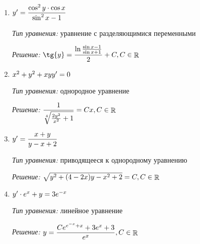 \begin{enumerate}                                                   
	\item 
		$ {y}' = \dfrac{\cos^{2}{y} \cdot \cos{x}}{\sin^2{x} - 1} $
		
		\textit{Тип уравнения:} уравнение с разделяющимися переменными
		
		\textit{Решение:} 
		$ \tg{y} = \dfrac{\ln{\frac{\sin{x} - 1}{\sin{x} + 1}}}{2} + C, C \in \rational $ 

	\item 
		$ {x}^2 + {y}^2 + xyy' = 0 $
		
		\textit{Тип уравнения:} однородное уравнение
		
		\textit{Решение:}
		$ \dfrac{1}{\sqrt[4]{\frac{2y^2}{x^2} + 1}} = Cx, C \in \mathop{\rm \mathbb{R}} $ 
		
	\newpage
		
	\item 
		$ {y}' = \dfrac{x + y}{y - x + 2} $
		
		\textit{Тип уравнения:} приводящееся к однородному уравнению
		
		\textit{Решение:}
		$ \sqrt{y^2 + (4 - 2x) y - x^2 + 2} = C, C \in \mathop{\rm \mathbb{R}} $    
		               
	\item
		$ {y}' \cdot e^{x} + {y} = 3e^{-x} $
		
		\textit{Тип уравнения:} линейное уравнение
		
		\textit{Решение:}
		$ y = \dfrac{Ce^{e^{-x} + x} + 3e^x + 3}{e^x}, C \in \mathop{\rm \mathbb{R}} $ 
		
\end{enumerate}
